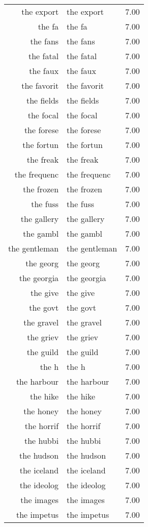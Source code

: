 \begin{table}[ht]
\begin{tabular}{rlr}
  the export & the export & 7.00 \\ 
  the fa & the fa & 7.00 \\ 
  the fans & the fans & 7.00 \\ 
  the fatal & the fatal & 7.00 \\ 
  the faux & the faux & 7.00 \\ 
  the favorit & the favorit & 7.00 \\ 
  the fields & the fields & 7.00 \\ 
  the focal & the focal & 7.00 \\ 
  the forese & the forese & 7.00 \\ 
  the fortun & the fortun & 7.00 \\ 
  the freak & the freak & 7.00 \\ 
  the frequenc & the frequenc & 7.00 \\ 
  the frozen & the frozen & 7.00 \\ 
  the fuss & the fuss & 7.00 \\ 
  the gallery & the gallery & 7.00 \\ 
  the gambl & the gambl & 7.00 \\ 
  the gentleman & the gentleman & 7.00 \\ 
  the georg & the georg & 7.00 \\ 
  the georgia & the georgia & 7.00 \\ 
  the give & the give & 7.00 \\ 
  the govt & the govt & 7.00 \\ 
  the gravel & the gravel & 7.00 \\ 
  the griev & the griev & 7.00 \\ 
  the guild & the guild & 7.00 \\ 
  the h & the h & 7.00 \\ 
  the harbour & the harbour & 7.00 \\ 
  the hike & the hike & 7.00 \\ 
  the honey & the honey & 7.00 \\ 
  the horrif & the horrif & 7.00 \\ 
  the hubbi & the hubbi & 7.00 \\ 
  the hudson & the hudson & 7.00 \\ 
  the iceland & the iceland & 7.00 \\ 
  the ideolog & the ideolog & 7.00 \\ 
  the images & the images & 7.00 \\ 
  the impetus & the impetus & 7.00 \\ 

\end{tabular}
\end{table}
